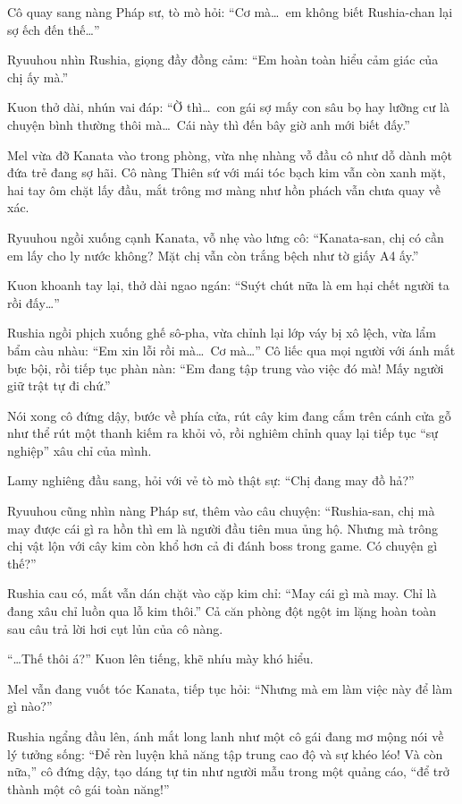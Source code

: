 \documentclass[../main.tex]{subfiles}
\begin{document}
Cô quay sang nàng Pháp sư, tò mò hỏi: ``Cơ mà\dots\ em không biết Rushia-chan lại sợ ếch đến thế\dots''

Ryuuhou nhìn Rushia, giọng đầy đồng cảm: ``Em hoàn toàn hiểu cảm giác của chị ấy mà.''

Kuon thở dài, nhún vai đáp: ``Ờ thì\dots\ con gái sợ mấy con sâu bọ hay lưỡng cư là chuyện bình thường thôi mà\dots\ Cái này thì đến bây giờ anh mới biết đấy.''

\ct

Mel vừa đỡ Kanata vào trong phòng, vừa nhẹ nhàng vỗ đầu cô như dỗ dành một đứa trẻ đang sợ hãi. Cô nàng Thiên sứ với mái tóc bạch kim vẫn còn xanh mặt, hai tay ôm chặt lấy đầu, mắt trông mơ màng như hồn phách vẫn chưa quay về xác.

Ryuuhou ngồi xuống cạnh Kanata, vỗ nhẹ vào lưng cô: ``Kanata-san, chị có cần em lấy cho ly nước không? Mặt chị vẫn còn trắng bệch như tờ giấy A4 ấy.''

Kuon khoanh tay lại, thở dài ngao ngán: ``Suýt chút nữa là em hại chết người ta rồi đấy\dots''

Rushia ngồi phịch xuống ghế sô-pha, vừa chỉnh lại lớp váy bị xô lệch, vừa lẩm bẩm càu nhàu: ``Em xin lỗi rồi mà\dots\ Cơ mà\dots'' Cô liếc qua mọi người với ánh mắt bực bội, rồi tiếp tục phàn nàn: ``Em đang tập trung vào việc đó mà! Mấy người giữ trật tự đi chứ.''

Nói xong cô đứng dậy, bước về phía cửa, rút cây kim đang cắm trên cánh cửa gỗ như thể rút một thanh kiếm ra khỏi vỏ, rồi nghiêm chỉnh quay lại tiếp tục ``sự nghiệp'' xâu chỉ của mình.

Lamy nghiêng đầu sang, hỏi với vẻ tò mò thật sự: ``Chị đang may đồ hả?''

Ryuuhou cũng nhìn nàng Pháp sư, thêm vào câu chuyện: ``Rushia-san, chị mà may được cái gì ra hồn thì em là người đầu tiên mua ủng hộ. Nhưng mà trông chị vật lộn với cây kim còn khổ hơn cả đi đánh boss trong game. Có chuyện gì thế?''

Rushia cau có, mắt vẫn dán chặt vào cặp kim chỉ: ``May cái gì mà may. Chỉ là đang xâu chỉ luồn qua lỗ kim thôi.'' Cả căn phòng đột ngột im lặng hoàn toàn sau câu trả lời hơi cụt lủn của cô nàng.

``\dots Thế thôi á?'' Kuon lên tiếng, khẽ nhíu mày khó hiểu.

Mel vẫn đang vuốt tóc Kanata, tiếp tục hỏi: ``Nhưng mà em làm việc này để làm gì nào?''

Rushia ngẩng đầu lên, ánh mắt long lanh như một cô gái đang mơ mộng nói về lý tưởng sống: ``Để rèn luyện khả năng tập trung cao độ và sự khéo léo! Và còn nữa,'' cô đứng dậy, tạo dáng tự tin như người mẫu trong một quảng cáo, ``để trở thành một cô gái toàn năng!''
\end{document}
